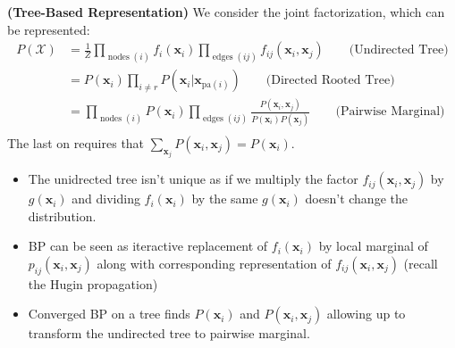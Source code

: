 \begin{remark}{\textbf{(Tree-Based Representation)}}
    We consider the joint factorization, which can be represented:
    \begin{equation*}
    \begin{aligned}
        P(\mathcal{X}) &= \frac{1}{Z}\prod_{\operatorname{nodes}(i)} f_i(\boldsymbol x_i)\prod_{\operatorname{edges}(ij)} f_{ij}(\boldsymbol x_i, \boldsymbol x_j) \qquad \text{(Undirected Tree)} \\
        &= P(\boldsymbol x_i)\prod_{i\ne r}P(\boldsymbol x_i | \boldsymbol x_{\text{pa}(i)}) \qquad \text{(Directed Rooted Tree)} \\
        &= \prod_{\operatorname{nodes}(i)}P(\boldsymbol x_i)\prod_{\operatorname{edges}(ij)}\frac{P(\boldsymbol x_i, \boldsymbol x_j)}{P(\boldsymbol x_i)P(\boldsymbol x_j)}  \qquad \text{(Pairwise Marginal)} \\
    \end{aligned}
    \end{equation*}
    The last on requires that $\sum_{\boldsymbol x_j}P(\boldsymbol x_i, \boldsymbol x_j) = P(\boldsymbol x_i)$. 
    \begin{itemize}
        \item The unidrected tree isn't unique as if we multiply the factor $f_{ij}(\boldsymbol x_i, \boldsymbol x_j)$ by $g(\boldsymbol x_i)$ and dividing $f_i(\boldsymbol x_i)$ by the same $g(\boldsymbol x_i)$ doesn't change the distribution. 
        \item BP can be seen as iteractive replacement of $f_i(\boldsymbol x_i)$ by local marginal of $p_{ij}(\boldsymbol x_i, \boldsymbol x_j)$ along with corresponding representation of $f_{ij}(\boldsymbol x_i, \boldsymbol x_j)$ (recall the Hugin propagation)
        \item Converged BP on a tree finds $P(\boldsymbol x_i)$ and $P(\boldsymbol x_i, \boldsymbol x_j)$ allowing up to transform the undirected tree to pairwise marginal. 
    \end{itemize}
\end{remark}


